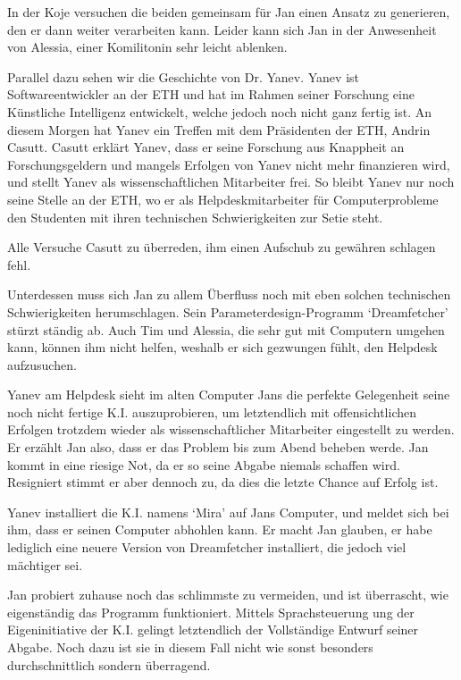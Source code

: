 \documentclass[11pt,a4paper,ngerman]{scrreprt}
\begin{document}
In der Koje versuchen die beiden gemeinsam für Jan einen Ansatz zu generieren,
den er dann weiter verarbeiten kann. Leider kann sich Jan in der Anwesenheit von
Alessia, einer Komilitonin sehr leicht ablenken.

Parallel dazu sehen wir die Geschichte von Dr. Yanev. Yanev ist
Softwareentwickler an der ETH und hat im Rahmen seiner Forschung eine Künstliche
Intelligenz entwickelt, welche jedoch noch nicht ganz fertig ist. An diesem
Morgen hat Yanev ein Treffen mit dem Präsidenten der ETH, Andrin
Casutt. Casutt erklärt Yanev, dass er seine Forschung aus Knappheit an
Forschungsgeldern und mangels Erfolgen von Yanev nicht mehr finanzieren wird,
und stellt Yanev als wissenschaftlichen Mitarbeiter frei. So bleibt Yanev nur
noch seine Stelle an der ETH, wo er als Helpdeskmitarbeiter für Computerprobleme
den Studenten mit ihren technischen Schwierigkeiten zur Setie steht.

Alle Versuche Casutt zu überreden, ihm einen Aufschub zu gewähren schlagen
fehl.

Unterdessen muss sich Jan zu allem Überfluss noch mit eben solchen technischen
Schwierigkeiten herumschlagen. Sein Parameterdesign-Programm `Dreamfetcher'
stürzt ständig ab. Auch Tim und Alessia, die sehr gut mit Computern umgehen
kann, können ihm nicht helfen, weshalb er sich gezwungen fühlt, den Helpdesk
aufzusuchen.

Yanev am Helpdesk sieht im alten Computer Jans die perfekte Gelegenheit seine
noch nicht fertige K.I. auszuprobieren, um letztendlich mit offensichtlichen
Erfolgen trotzdem wieder als wissenschaftlicher Mitarbeiter eingestellt zu
werden. Er erzählt Jan also, dass er das Problem bis zum Abend beheben
werde. Jan kommt in eine riesige Not, da er so seine Abgabe niemals schaffen
wird. Resigniert stimmt er aber dennoch zu, da dies die letzte Chance auf Erfolg
ist.

Yanev installiert die K.I. namens `Mira' auf Jans Computer, und meldet sich bei
ihm, dass er seinen Computer abhohlen kann. Er macht Jan glauben, er habe
lediglich eine neuere Version von Dreamfetcher installiert, die jedoch viel
mächtiger sei.

Jan probiert zuhause noch das schlimmste zu vermeiden, und ist überrascht, wie
eigenständig das Programm funktioniert. Mittels Sprachsteuerung ung der
Eigeninitiative der K.I. gelingt letztendlich der Vollständige Entwurf seiner
Abgabe. Noch dazu ist sie in diesem Fall nicht wie sonst besonders
durchschnittlich sondern überragend.
\end{document}
